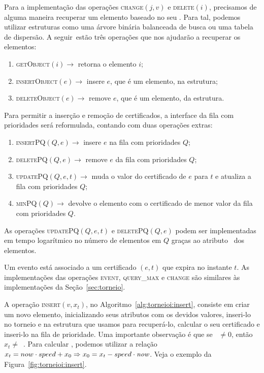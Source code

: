 Para a implementação das operações \textsc{change}$(j, v)$ e \textsc{delete}$(i)$, precisamos de
alguma maneira recuperar um elemento baseado no seu \id.
Para tal, podemos utilizar estruturas como uma árvore binária balanceada de busca ou uma tabela de
dispersão.
A seguir~estão três operações que nos ajudarão a recuperar os elementos:
\begin{enumerate}
    \item \textsc{getObject}$(i)\rightarrow$ retorna o elemento $i$;
    \item \textsc{insertObject}$(e) \rightarrow$ insere $e$, que é
    um elemento, na estrutura;
    \item \textsc{deleteObject}$(e) \rightarrow$ remove $e$, que é
    um elemento, da estrutura.
\end{enumerate}
Para permitir a inserção e remoção de certificados, a interface da fila com prioridades será
reformulada, contando com duas operações extras:
\begin{enumerate}
    \item \textsc{insertPQ}$(Q, e) \rightarrow$ insere $e$ na fila
    com prioridades $Q$;
    \item \textsc{deletePQ}$(Q, e) \rightarrow$ remove $e$ da fila
    com prioridades $Q$;
    \item \textsc{updatePQ}$(Q,e,t) \rightarrow$ muda o valor do
    certificado de $e$ para $t$ e atualiza a fila com prioridades
    $Q$;
    \item \textsc{minPQ}$(Q) \rightarrow$ devolve o elemento com o
    certificado de menor valor da fila com prioridades $Q$.
\end{enumerate}
As operações \textsc{updatePQ}$(Q,e,t)$ e \textsc{deletePQ}$(Q, e)$ podem ser implementadas em
tempo logarítmico no número de elementos em $Q$ graças ao atributo \pqpos~dos elementos.

Um evento está associado a um certificado $(e, t)$ que expira no instante $t$.
As implementações das operações \textsc{event}, \textsc{query\_max} e \textsc{change} são
similares às implementações da Seção~\ref{sec:torneio}.



A operação \textsc{insert}$(v, x_t)$, no Algoritmo~\ref{alg:torneioi:insert}, consiste em criar um
novo elemento, inicializando seus atributos com os devidos valores, inseri-lo no torneio e na
estrutura que usamos para recuperá-lo, calcular o seu certificado e inseri-lo na fila de
prioridade.
Uma importante observação é que se \now~$\neq 0$, então $x_t \neq$~\initv.
Para calcular \initv, podemos utilizar a relação $x_t = now\cdot speed + x_0 \Rightarrow x_0 = x_t
- speed\cdot\textit{now}$.
Veja o exemplo da Figura~\ref{fig:torneioi:insert}.

